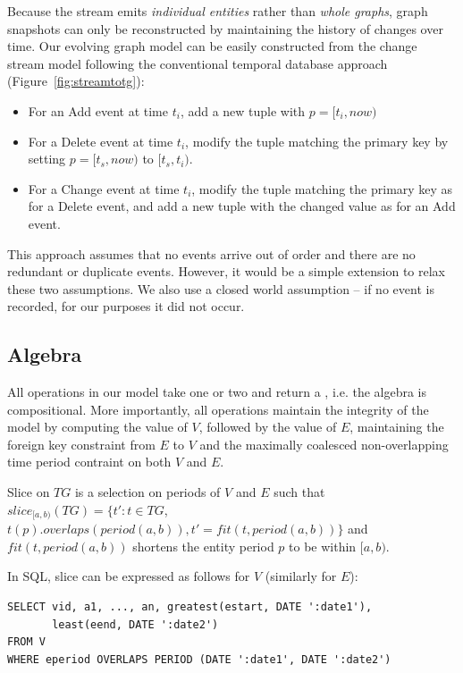 Because the stream emits {\em individual entities} rather than {\em
  whole graphs}, graph snapshots can only be reconstructed by
maintaining the history of changes over time.  Our evolving graph
model can be easily constructed from the change stream model following
the conventional temporal database approach
(Figure~\ref{fig:streamtotg}):
\begin{itemize}[noitemsep,topsep=0pt]
\item For an Add event at time $t_i$, add a new tuple with $p=[t_i,
  now)$
\item For a Delete event at time $t_i$, modify the tuple matching the
  primary key by setting $p=[t_s, now)$ to $[t_s, t_i)$.
\item For a Change event at time $t_i$, modify the tuple matching the
  primary key as for a Delete event, and add a new tuple with the
  changed value as for an Add event.
\end{itemize}

This approach assumes that no events arrive out of order and there are
no redundant or duplicate events.  However, it would be a simple
extension to relax these two assumptions.  We also use a closed world
assumption -- if no event is recorded, for our purposes it did not
occur.

\subsection{Algebra}
\label{sec:model:algebra}

All operations in our model take one or two \tgs and return a \tg,
i.e. the algebra is compositional.  More importantly, all operations
maintain the integrity of the model by computing the value of $V$,
followed by the value of $E$, maintaining the foreign key constraint
from $E$ to $V$ and the maximally coalesced non-overlapping time
period contraint on both $V$ and $E$.

\begin{definition}[Slice]
Slice on $TG$ is a selection on periods of $V$ and $E$ such that
$slice_{[a,b)}(TG) = \{t': t \in TG$, $t(p).overlaps(period(a,b)), t'
  = fit(t, period(a,b))\}$ and $fit(t, period(a,b))$ shortens the
  entity period $p$ to be within $[a,b)$.
\label{def:slice}
\end{definition}

In SQL, slice can be expressed as follows for $V$
(similarly for $E$):

\begin{small}
\begin{verbatim}
SELECT vid, a1, ..., an, greatest(estart, DATE ':date1'), 
       least(eend, DATE ':date2')
FROM V
WHERE eperiod OVERLAPS PERIOD (DATE ':date1', DATE ':date2')
\end{verbatim}
\end{small}


